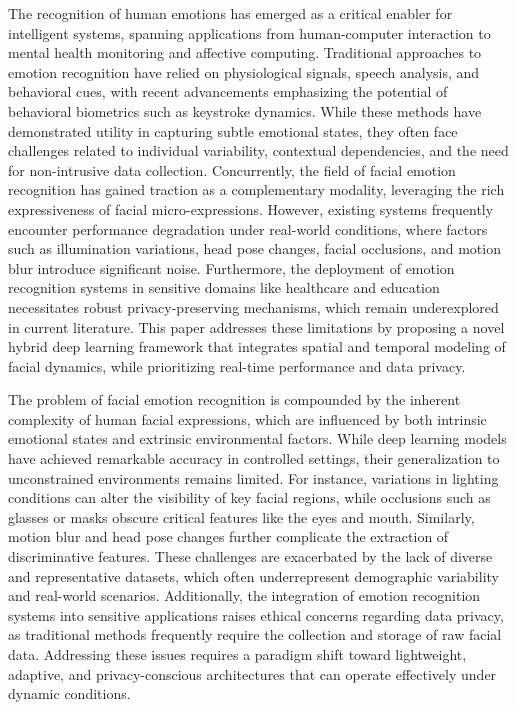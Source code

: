 \documentclass[conference]{IEEEtran}
\begin{document}
The recognition of human emotions has emerged as a critical enabler for intelligent systems, spanning applications from human-computer interaction to mental health monitoring and affective computing. Traditional approaches to emotion recognition have relied on physiological signals, speech analysis, and behavioral cues, with recent advancements emphasizing the potential of behavioral biometrics such as keystroke dynamics. While these methods have demonstrated utility in capturing subtle emotional states, they often face challenges related to individual variability, contextual dependencies, and the need for non-intrusive data collection. Concurrently, the field of facial emotion recognition has gained traction as a complementary modality, leveraging the rich expressiveness of facial micro-expressions. However, existing systems frequently encounter performance degradation under real-world conditions, where factors such as illumination variations, head pose changes, facial occlusions, and motion blur introduce significant noise. Furthermore, the deployment of emotion recognition systems in sensitive domains like healthcare and education necessitates robust privacy-preserving mechanisms, which remain underexplored in current literature. This paper addresses these limitations by proposing a novel hybrid deep learning framework that integrates spatial and temporal modeling of facial dynamics, while prioritizing real-time performance and data privacy.  

The problem of facial emotion recognition is compounded by the inherent complexity of human facial expressions, which are influenced by both intrinsic emotional states and extrinsic environmental factors. While deep learning models have achieved remarkable accuracy in controlled settings, their generalization to unconstrained environments remains limited. For instance, variations in lighting conditions can alter the visibility of key facial regions, while occlusions such as glasses or masks obscure critical features like the eyes and mouth. Similarly, motion blur and head pose changes further complicate the extraction of discriminative features. These challenges are exacerbated by the lack of diverse and representative datasets, which often underrepresent demographic variability and real-world scenarios. Additionally, the integration of emotion recognition systems into sensitive applications raises ethical concerns regarding data privacy, as traditional methods frequently require the collection and storage of raw facial data. Addressing these issues requires a paradigm shift toward lightweight, adaptive, and privacy-conscious architectures that can operate effectively under dynamic conditions.  
\end{document}
